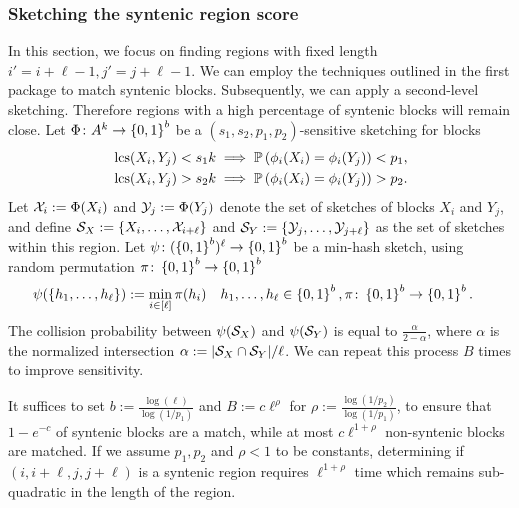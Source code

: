 \subsubsection*{Sketching the syntenic region score}
In this section, we focus on finding regions with fixed length $i'=i+\ell-1, j'=j+\ell-1$.  
We can employ the techniques outlined in the first package to match syntenic blocks. Subsequently, we can apply a second-level sketching. Therefore regions with a high percentage of syntenic blocks will remain close. Let $\Phi\colon A^k\to \left\{0,1\right\}^b$ be a $(s_1,s_2, p_1, p_2)$-sensitive sketching for blocks
\begin{align}
    &\operatorname{\mathrm{lcs}}(X_i,Y_j)<s_1 k \implies \mathbb{P}\left( \phi_i(X_i)=\phi_i(Y_j) \right) < p_1, \\
    &\operatorname{\mathrm{lcs}}(X_i,Y_j)>s_2 k \implies \mathbb{P}\left( \phi_i(X_i)=\phi_i(Y_j) \right) > p_2.
\end{align}
Let $\mathcal{X}_i:=\Phi(X_i)$ and $\mathcal{Y}_j:=\Phi(Y_j)$ denote the set of sketches of blocks $X_i$ and $Y_j$, and define 
$\mathcal{S}_X:=\left\{X_i,\dots,\mathcal{X}_{i+\ell}\right\}$ and $\mathcal{S}_Y:=\left\{\mathcal{Y}_j, \dots, \mathcal{Y}_{j+\ell}\right\}$ as the set of sketches within this region. 
Let $\psi\colon (\left\{0,1\right\}^b)^\ell\to\left\{0,1\right\}^b$ be a min-hash sketch, using random permutation $\pi\colon\left\{0,1\right\}^b\to\left\{0,1\right\}^b$
\begin{align}
    &\psi(\left\{h_1,\dots,h_\ell\right\}):=\min_{i\in[\ell]} \pi(h_i)  && h_1,\dots, h_\ell\in \left\{0,1\right\}^b, \pi\colon \left\{0,1\right\}^b\to \left\{0,1\right\}^b.
\end{align}
The collision probability between $\psi(\mathcal{S}_X)$ and $\psi(\mathcal{S}_Y)$ is equal to $\frac{\alpha}{2-\alpha}$, where $\alpha$ is the normalized intersection $\alpha:=|\mathcal{S}_X\cap \mathcal{S}_Y|/\ell$. We can repeat this process $B$ times to improve sensitivity. 

It suffices to set $b:=\frac{\log(\ell)}{\log(1/p_1)}$ and $B:=c \ell^\rho$ for $\rho:=\frac{\log(1/p_2)}{\log(1/p_1)}$, to ensure that $1-e^{-c}$ of syntenic blocks are a match, while at most $c \ell^{1+\rho} $ non-syntenic blocks are matched. If we assume $p_1, p_2$ and $\rho < 1$ to be constants, determining if $(i,i+\ell, j, j+\ell)$ is a syntenic region requires $\ell^{1+\rho}$ time which remains sub-quadratic in the length of the region.  




